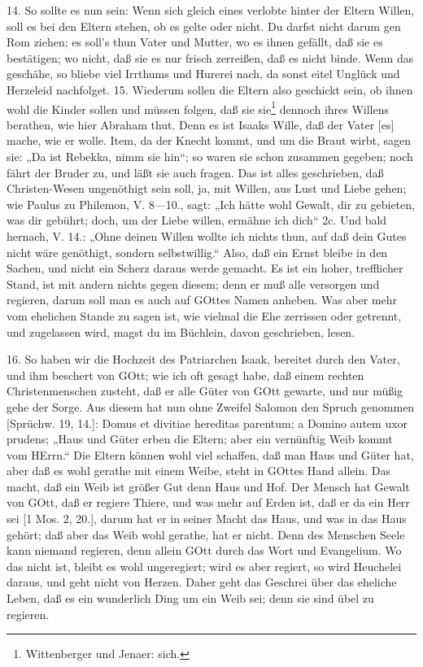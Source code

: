 14. So sollte es nun sein: Wenn sich gleich eines verlobte hinter der Eltern Willen, soll es bei den Eltern stehen, ob es gelte oder nicht. Du darfst nicht darum gen Rom ziehen; es soll's thun Vater und Mutter, wo es ihnen gefällt, daß sie es bestätigen; wo nicht, daß sie es nur frisch zerreißen, daß es nicht binde. Wenn das geschähe, so bliebe viel Irrthums und Hurerei nach, da sonst eitel Unglück und Herzeleid nachfolget.
15. Wiederum sollen die Eltern also geschickt sein, ob ihnen wohl die Kinder sollen und müssen folgen, daß sie sie\footnote{Wittenberger und Jenaer: sich.} dennoch ihres Willens berathen, wie hier Abraham thut. Denn es ist Isaaks Wille, daß der Vater [es] mache, wie er wolle. Item, da der Knecht kommt, und um die Braut wirbt, sagen sie: „Da ist Rebekka, nimm sie hin“; so waren sie schon zusammen gegeben; noch fährt der Bruder zu, und läßt sie auch fragen. Das ist alles geschrieben, daß Christen-Wesen ungenöthigt sein soll, ja, mit Willen, aus Lust und Liebe gehen; wie Paulus zu Philemon, V. 8—10., sagt: „Ich hätte wohl Gewalt, dir zu gebieten, was dir gebührt; doch, um der Liebe willen, ermähne ich dich“ 2c. Und bald hernach, V. 14.: „Ohne deinen Willen wollte ich nichts thun, auf daß dein Gutes nicht wäre genöthigt, sondern selbstwillig.“ Also, daß ein Ernst bleibe in den Sachen, und nicht ein Scherz daraus werde gemacht. Es ist ein hoher, trefflicher Stand, ist mit andern nichts gegen diesem; denn er muß alle versorgen und regieren, darum soll man es auch auf GOttes Namen anheben. Was aber mehr vom ehelichen Stande zu sagen ist, wie vielmal die Ehe zerrissen oder getrennt, und zugelassen wird, magst du im Büchlein, davon geschrieben, lesen.

16. So haben wir die Hochzeit des Patriarchen Isaak, bereitet durch den Vater, und ihm beschert von GOtt; wie ich oft gesagt habe, daß einem rechten Christenmenschen zusteht, daß er alle Güter von GOtt gewarte, und nur müßig gehe der Sorge. Aus diesem hat nun ohne Zweifel Salomon den Spruch genommen [Sprüchw. 19, 14.]: Domus et divitiae hereditas parentum; a Domino autem uxor prudens; „Haus und Güter erben die Eltern; aber ein vernünftig Weib kommt vom HErrn.“ Die Eltern können wohl viel schaffen, daß man Haus und Güter hat, aber daß es wohl gerathe mit einem Weibe, steht in GOttes Hand allein. Das macht, daß ein Weib ist größer Gut denn Haus und Hof. Der Mensch hat Gewalt von GOtt, daß er regiere Thiere, und was mehr auf Erden ist, daß er da ein Herr sei [1 Mos. 2, 20.], darum hat er in seiner Macht das Haus, und was in das Haus gehört; daß aber das Weib wohl gerathe, hat er nicht. Denn des Menschen Seele kann niemand regieren, denn allein GOtt durch das Wort und Evangelium. Wo das nicht ist, bleibt es wohl ungeregiert; wird es aber regiert, so wird Heuchelei daraus, und geht nicht von Herzen. Daher geht das Geschrei über das eheliche Leben, daß es ein wunderlich Ding um ein Weib sei; denn sie sind übel zu regieren.

